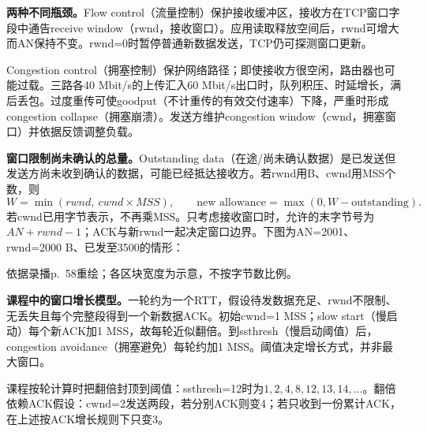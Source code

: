 
\textbf{两种不同瓶颈。}Flow control（流量控制）保护接收缓冲区，接收方在TCP窗口字段中通告receive window（rwnd，接收窗口）。应用读取释放空间后，rwnd可增大而AN保持不变。rwnd=0时暂停普通新数据发送，TCP仍可探测窗口更新。

Congestion control（拥塞控制）保护网络路径；即使接收方很空闲，路由器也可能过载。三路各40 Mbit/s的上传汇入60 Mbit/s出口时，队列积压、时延增长，满后丢包。过度重传可使goodput（不计重传的有效交付速率）下降，严重时形成congestion collapse（拥塞崩溃）。发送方维护congestion window（cwnd，拥塞窗口）并依据反馈调整负载。

\textbf{窗口限制尚未确认的总量。}Outstanding data（在途/尚未确认数据）是已发送但发送方尚未收到确认的数据，可能已经抵达接收方。若rwnd用B、cwnd用MSS个数，则
\[
 \boxed{W=\min(rwnd,\ cwnd\times MSS)},\qquad
 \boxed{\text{new allowance}=\max(0,W-\text{outstanding})}.
\]
若cwnd已用字节表示，不再乘MSS。只考虑接收窗口时，允许的末字节号为$AN+rwnd-1$；ACK与新rwnd一起决定窗口边界。下图为AN=2001、rwnd=2000 B、已发至3500的情形：

\begin{center}

\small 依据录播p.~58重绘；各区块宽度为示意，不按字节数比例。
\end{center}

\textbf{课程中的窗口增长模型。}一轮约为一个RTT，假设待发数据充足、rwnd不限制、无丢失且每个完整段得到一个新数据ACK。初始cwnd=1 MSS；slow start（慢启动）每个新ACK加1 MSS，故每轮近似翻倍。到ssthresh（慢启动阈值）后，congestion avoidance（拥塞避免）每轮约加1 MSS。阈值决定增长方式，并非最大窗口。

课程按轮计算时把翻倍封顶到阈值：ssthresh=12时为$1,2,4,8,12,13,14,\ldots$。翻倍依赖ACK假设：cwnd=2发送两段，若分别ACK则变4；若只收到一份累计ACK，在上述按ACK增长规则下只变3。

